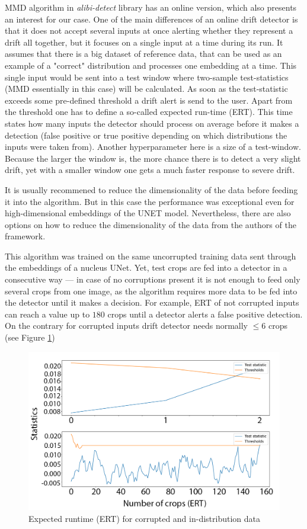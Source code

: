 MMD algorithm in \textit{alibi-detect} library has an online version, which also presents an interest for our case. One of the main differences of an online drift detector is that it does not accept several inputs at once alerting whether they represent a drift all together, but it focuses on a single input at a time during its run. It assumes that there is a big dataset of reference data, that can be used as an example of a "correct" distribution and processes one embedding at a time. This single input would be sent into a test window where two-sample test-statistics (MMD essentially in this case) will be calculated. As soon as the test-statistic exceeds some pre-defined threshold a drift alert is send to the user. Apart from the threshold one has to define a so-called expected run-time (ERT). This time states how many inputs the detector should process on average before it makes a detection (false positive or true positive depending on which distributions the inputs were taken from). Another hyperparameter here is a size of a test-window. Because the larger the window is, the more chance there is to detect a very slight drift, yet with a smaller window one gets a much faster response to severe drift. 

It is usually recommened to reduce the dimensionality of the data before feeding it into the algorithm. But in this case the performance was exceptional even for high-dimensional embeddings of the UNET model. Nevertheless, there are also options on how to reduce the dimensionality of the data from the authors of the framework.

This algorithm was trained on the same uncorrupted training data sent through the embeddings of a nucleus UNet. Yet, test crops are fed into a detector in a consecutive way --- in case of no corruptions present it is not enough to feed only several crops from one image, as the algorithm requires more data to be fed into the detector until it makes a decision. For example, ERT of not corrupted inputs can reach a value up to $180$ crops until a detector alerts a false positive detection. On the contrary for corrupted inputs drift detector needs normally $\leq 6$ crops (see Figure \ref{fig:online-ert})
\begin{figure}[htb]
	\begin{center}
		\includegraphics[width=0.6\linewidth]{bilder/drift-detection/online.png}
		\caption{Expected runtime (ERT) for corrupted and in-distribution data}\label{fig:online-ert}
	\end{center}
\end{figure}

